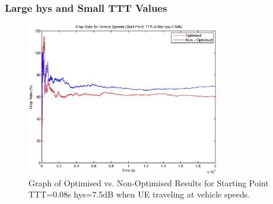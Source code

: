 \subsubsection*{Large hys and Small TTT Values}
\begin{figure}[H]
  \begin{center}
    	  \includegraphics[width=0.75\textwidth]{figures/vehicle_figures/highhys/long_drop.eps}
    \end{center}
    \caption{Graph of Optimised vs. Non-Optimised Results for Starting Point TTT=0.08s hys=7.5dB when UE traveling at vehicle speeds.}
    \label{fig:veh_highhys_drop}
\end{figure}

